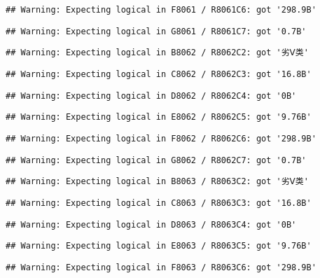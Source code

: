 \documentclass[
]{article}
\begin{document}
\begin{verbatim}
## Warning: Expecting logical in F8061 / R8061C6: got '298.9B'
\end{verbatim}

\begin{verbatim}
## Warning: Expecting logical in G8061 / R8061C7: got '0.7B'
\end{verbatim}

\begin{verbatim}
## Warning: Expecting logical in B8062 / R8062C2: got '劣Ⅴ类'
\end{verbatim}

\begin{verbatim}
## Warning: Expecting logical in C8062 / R8062C3: got '16.8B'
\end{verbatim}

\begin{verbatim}
## Warning: Expecting logical in D8062 / R8062C4: got '0B'
\end{verbatim}

\begin{verbatim}
## Warning: Expecting logical in E8062 / R8062C5: got '9.76B'
\end{verbatim}

\begin{verbatim}
## Warning: Expecting logical in F8062 / R8062C6: got '298.9B'
\end{verbatim}

\begin{verbatim}
## Warning: Expecting logical in G8062 / R8062C7: got '0.7B'
\end{verbatim}

\begin{verbatim}
## Warning: Expecting logical in B8063 / R8063C2: got '劣Ⅴ类'
\end{verbatim}

\begin{verbatim}
## Warning: Expecting logical in C8063 / R8063C3: got '16.8B'
\end{verbatim}

\begin{verbatim}
## Warning: Expecting logical in D8063 / R8063C4: got '0B'
\end{verbatim}

\begin{verbatim}
## Warning: Expecting logical in E8063 / R8063C5: got '9.76B'
\end{verbatim}

\begin{verbatim}
## Warning: Expecting logical in F8063 / R8063C6: got '298.9B'
\end{verbatim}
\end{document}
